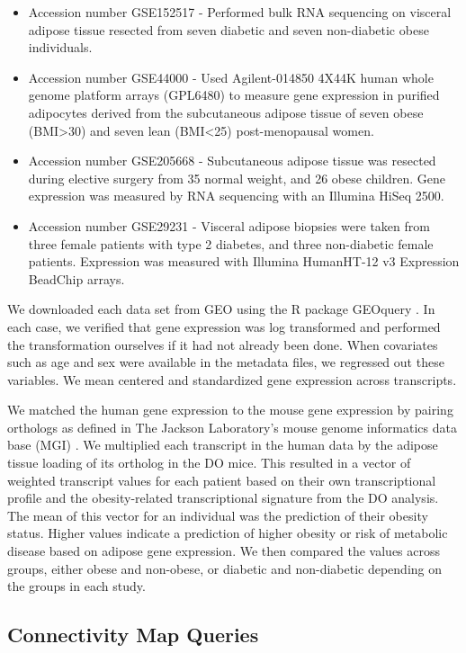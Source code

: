 \documentclass[
]{article}
\begin{document}
\begin{itemize}
\item
  Accession number GSE152517 - Performed bulk RNA sequencing on visceral
  adipose tissue resected from seven diabetic and seven non-diabetic
  obese individuals.
\item
  Accession number GSE44000 - Used Agilent-014850 4X44K human whole
  genome platform arrays (GPL6480) to measure gene expression in
  purified adipocytes derived from the subcutaneous adipose tissue of
  seven obese (BMI\textgreater30) and seven lean (BMI\textless25)
  post-menopausal women.
\item
  Accession number GSE205668 - Subcutaneous adipose tissue was resected
  during elective surgery from 35 normal weight, and 26 obese children.
  Gene expression was measured by RNA sequencing with an Illumina HiSeq
  2500.
\item
  Accession number GSE29231 - Visceral adipose biopsies were taken from
  three female patients with type 2 diabetes, and three non-diabetic
  female patients. Expression was measured with Illumina HumanHT-12 v3
  Expression BeadChip arrays.
\end{itemize}

We downloaded each data set from GEO using the R package GEOquery
\cite{geoquery}. In each case, we verified that gene expression was log
transformed and performed the transformation ourselves if it had not
already been done. When covariates such as age and sex were available in
the metadata files, we regressed out these variables. We mean centered
and standardized gene expression across transcripts.

We matched the human gene expression to the mouse gene expression by
pairing orthologs as defined in The Jackson Laboratory's mouse genome
informatics data base (MGI) \cite{pmid38531069}. We multiplied each
transcript in the human data by the adipose tissue loading of its
ortholog in the DO mice. This resulted in a vector of weighted
transcript values for each patient based on their own transcriptional
profile and the obesity-related transcriptional signature from the DO
analysis. The mean of this vector for an individual was the prediction
of their obesity status. Higher values indicate a prediction of higher
obesity or risk of metabolic disease based on adipose gene expression.
We then compared the values across groups, either obese and non-obese,
or diabetic and non-diabetic depending on the groups in each study.

\subsection{Connectivity Map Queries}\label{connectivity-map-queries}
\end{document}
